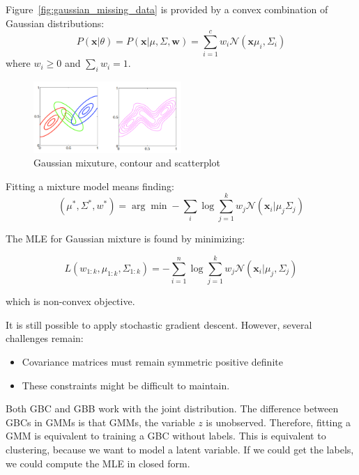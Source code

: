 \documentclass[a4paper,10pt,twoside]{article}
\begin{document}
Figure~\ref{fig:gaussian_missing_data} is provided by a convex combination of Gaussian distributions:
\begin{equation*}
  P(\mathbf{x}|\theta) = P(\mathbf{x}|\mu,\Sigma,\mathbf{w}) = \sum_{i=1}^{c}w_i\mathcal{N}(\mathbf{x}\mu_i,\Sigma_i)
\end{equation*}
where $w_i\geq 0$ and $\sum_iw_i=1$.

\begin{figure}
  \centering
  \includegraphics[width=0.5\textwidth]{figures/Gaussian_mixtures_2.png}
  \caption{Gaussian mixuture, contour and scatterplot}
  \label{fig:gmm2}
\end{figure}

Fitting a mixture model means finding:
\begin{equation*}
  (\mu^*,\Sigma^*,w^*) = \arg\min-\sum_i\log\sum_{j=1}^{k}w_j\mathcal{N}(\mathbf{x}_i|\mu_j\Sigma_j)
\end{equation*}

The MLE for Gaussian mixture is found by minimizing:

\begin{equation*}
  L(w_{1:k},\mu_{1:k},\Sigma_{1:k})=-\sum_{i=1}^{n}\log\sum_{j=1}^{k}w_j\mathcal{N}(\mathbf{x}_i|\mu_j,\Sigma_j)
\end{equation*}

which is non-convex objective.

It is still possible to apply stochastic gradient descent. However, several challenges remain:
\begin{itemize}
\item Covariance matrices must remain symmetric positive definite
\item These constraints might be difficult to maintain.
\end{itemize}

Both GBC and GBB work with the joint distribution. The difference between GBCs in GMMs is that GMMs, the variable $z$ is unobserved. Therefore, fitting a GMM is equivalent to training a GBC without labels. This is equivalent to clustering, because we want to model a latent variable. If we could get the labels, we could compute the MLE in closed form.
\end{document}
